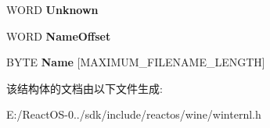 \begin{DoxyCompactItemize}
W\+O\+RD {\bfseries Unknown}
\item 
\mbox{\label{struct___s_y_s_t_e_m___m_o_d_u_l_e_aa82110ffb332f4d44f208907c3e822f5}} 
W\+O\+RD {\bfseries Name\+Offset}
\item 
\mbox{\label{struct___s_y_s_t_e_m___m_o_d_u_l_e_af7eb57e3d8c7ffc3a82bea61edf9ad9c}} 
B\+Y\+TE {\bfseries Name} \mbox{[}M\+A\+X\+I\+M\+U\+M\+\_\+\+F\+I\+L\+E\+N\+A\+M\+E\+\_\+\+L\+E\+N\+G\+TH\mbox{]}
\end{DoxyCompactItemize}


该结构体的文档由以下文件生成\+:\begin{DoxyCompactItemize}
\item 
E\+:/\+React\+O\+S-\/0../sdk/include/reactos/wine/winternl.\+h\end{DoxyCompactItemize}
